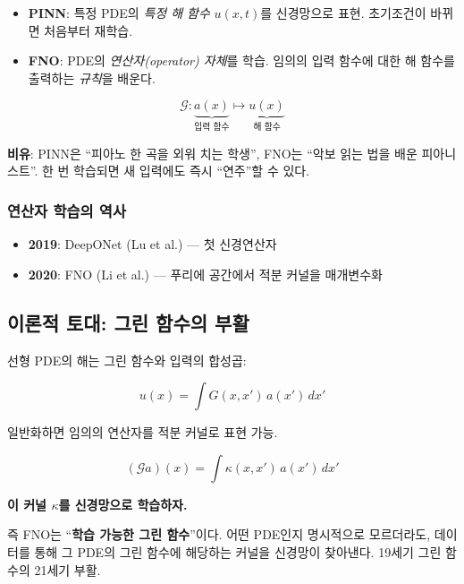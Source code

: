 \documentclass[11pt,a4paper]{article}
\begin{document}
\begin{itemize}
\item \textbf{PINN}: 특정 PDE의 \emph{특정 해 함수} $u(x, t)$를 신경망으로 표현. 초기조건이 바뀌면 처음부터 재학습.
\item \textbf{FNO}: PDE의 \emph{연산자(operator) 자체}를 학습. 임의의 입력 함수에 대한 해 함수를 출력하는 \emph{규칙}을 배운다.
\end{itemize}

\begin{equation}
\mathcal{G}: \underbrace{a(x)}_{\text{입력 함수}} \mapsto \underbrace{u(x)}_{\text{해 함수}}
\end{equation}

\textbf{비유}: PINN은 ``피아노 한 곡을 외워 치는 학생'', FNO는 ``악보 읽는 법을 배운 피아니스트''. 한 번 학습되면 새 입력에도 즉시 ``연주''할 수 있다.

\subsubsection{연산자 학습의 역사}

\begin{itemize}
\item \textbf{2019}: DeepONet (Lu et al.) --- 첫 신경연산자
\item \textbf{2020}: FNO (Li et al.) --- 푸리에 공간에서 적분 커널을 매개변수화
\end{itemize}

\subsection{이론적 토대: 그린 함수의 부활}

선형 PDE의 해는 그린 함수와 입력의 합성곱:

\begin{equation}
u(x) = \int G(x, x')\, a(x')\, dx'
\end{equation}

일반화하면 임의의 연산자를 적분 커널로 표현 가능.

\begin{equation}
(\mathcal{G}a)(x) = \int \kappa(x, x')\, a(x')\, dx'
\end{equation}

\begin{insightbox}[FNO의 핵심 발상]
\textbf{이 커널 $\kappa$를 신경망으로 학습하자.}

즉 FNO는 ``\textbf{학습 가능한 그린 함수}''이다. 어떤 PDE인지 명시적으로 모르더라도, 데이터를 통해 그 PDE의 그린 함수에 해당하는 커널을 신경망이 찾아낸다. 19세기 그린 함수의 21세기 부활.
\end{insightbox}
\end{document}
